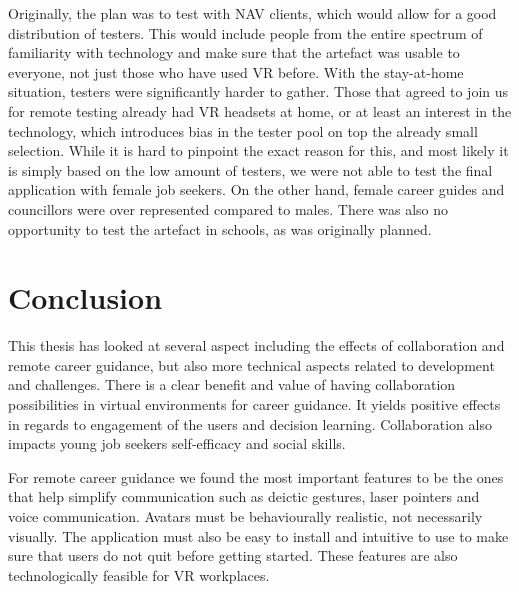 Originally, the plan was to test with NAV clients, which would allow for a good distribution of testers. This would include people from the entire spectrum of familiarity with technology and make sure that the artefact was usable to everyone, not just those who have used VR before. With the stay-at-home situation, testers were significantly harder to gather. Those that agreed to join us for remote testing already had VR headsets at home, or at least an interest in the technology, which introduces bias in the tester pool on top the already small selection. While it is hard to pinpoint the exact reason for this, and most likely it is simply based on the low amount of testers, we were not able to test the final application with female job seekers. On the other hand, female career guides and councillors were over represented compared to males. There was also no opportunity to test the artefact in schools, as was originally planned.






\section{Conclusion}
This thesis has looked at several aspect including the effects of collaboration and remote career guidance, but also more technical aspects related to development and challenges. 
There is a clear benefit and value of having collaboration possibilities in virtual environments for career guidance. It yields positive effects in regards to engagement of the users and decision learning. Collaboration also impacts young job seekers self-efficacy and social skills. 

For remote career guidance we found the most important features to be the ones that help simplify communication such as deictic gestures, laser pointers and voice communication. Avatars must be behaviourally realistic, not necessarily visually. The application must also be easy to install and intuitive to use to make sure that users do not quit before getting started. These features are also technologically feasible for VR workplaces.


